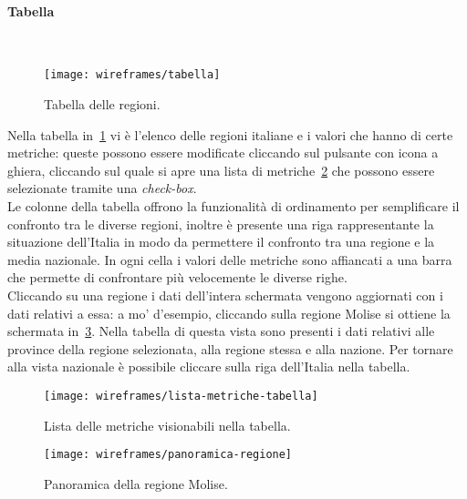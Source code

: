 \documentclass[../../../main.tex]{subfiles}
\begin{document}
\paragraph{Tabella}\mbox{}\\
\begin{figure}[H]
    \centering
    \texttt{[image: wireframes/tabella]}
    \caption{Tabella delle regioni.}
    \label{fig:tabella}
\end{figure}
Nella tabella in~\ref{fig:tabella} vi è l'elenco delle regioni italiane e i valori che hanno di certe metriche: queste possono essere modificate cliccando sul pulsante con icona a ghiera, cliccando sul quale si apre una lista di metriche~\ref{fig:lista-metriche-tabella} che possono essere selezionate tramite una \textit{check-box}.\\
Le colonne della tabella offrono la funzionalità di ordinamento per semplificare il confronto tra le diverse regioni, inoltre è presente una riga rappresentante la situazione dell'Italia in modo da permettere il confronto tra una regione e la media nazionale. In ogni cella i valori delle metriche sono affiancati a una barra che permette di confrontare più velocemente le diverse righe.\\
Cliccando su una regione i dati dell'intera schermata vengono aggiornati con i dati relativi a essa: a mo' d'esempio, cliccando sulla regione Molise si ottiene la schermata in~\ref{fig:panoramica-regione}. Nella tabella di questa vista sono presenti i dati relativi alle province della regione selezionata, alla regione stessa e alla nazione. Per tornare alla vista nazionale è possibile cliccare sulla riga dell'Italia nella tabella.
\begin{figure}[H]
    \centering
    \texttt{[image: wireframes/lista-metriche-tabella]}
    \caption{Lista delle metriche visionabili nella tabella.}
    \label{fig:lista-metriche-tabella}
\end{figure}

\begin{figure}[H]
    \centering
    \texttt{[image: wireframes/panoramica-regione]}
    \caption{Panoramica della regione Molise.}
    \label{fig:panoramica-regione}
\end{figure}
\clearpage
\end{document}
